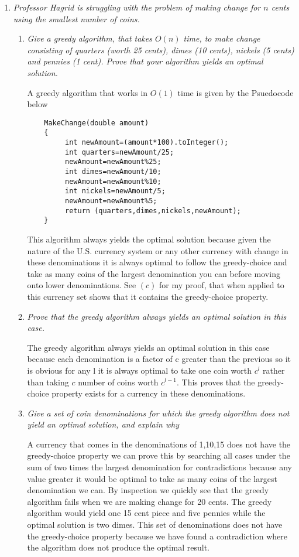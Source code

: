 \documentclass[12pt]{article}
\begin{document}
\begin{enumerate}
\begin{enumerate}
	\end{enumerate}
	
	
	\newpage
	
	\item \textit{Professor Hagrid is struggling with the problem of making change for $n$ cents using the smallest number of coins.}
	
	
	\begin{enumerate}

	\item \textit{Give a greedy algorithm, that takes $O(n)$ time, to make change consisting of quarters (worth 25 cents), dimes (10 cents), nickels (5 cents) and pennies (1 cent). Prove that your algorithm yields an optimal solution.}

	A greedy algorithm that works in $O(1)$ time is given by the Psuedocode below
	\begin{verbatim}
	MakeChange(double amount)
	{
		 int newAmount=(amount*100).toInteger();
		 int quarters=newAmount/25;
		 newAmount=newAmount%25;
		 int dimes=newAmount/10;
		 newAmount=newAmount%10;
		 int nickels=newAmount/5;
		 newAmount=newAmount%5;
		 return (quarters,dimes,nickels,newAmount);
	}
	\end{verbatim}
	This algorithm always yields the optimal solution because given the nature of the U.S. currency system or any other currency with change in these denominations it is always optimal to follow the greedy-choice and take as many coins of the largest denomination you can before moving onto lower denominations. See $(c)$ for my proof, that when applied to this currency set shows that it contains the greedy-choice property.

	\item \textit{Prove that the greedy algorithm always yields an optimal solution in this case.}

	The greedy algorithm always yields an optimal solution in this case because each denomination is a factor of c greater than the previous so it is obvious for any l it is always optimal to take one coin worth $c^l$ rather than taking $c$ number of coins worth $c^{l-1}$. This proves that the greedy-choice property exists for a currency in these denominations.
\newpage
	\item \textit{Give a set of coin denominations for which the greedy algorithm does not yield an optimal solution, and explain why}

	A currency that comes in the denominations of {1,10,15} does not have the greedy-choice property we can prove this by searching all cases under the sum of two times the largest denomination for contradictions because any value greater it would be optimal to take as many coins of the largest denomination we can. By inspection we quickly see that the greedy algorithm fails when we are making change for 20 cents. The greedy algorithm would yield one 15 cent piece and five pennies while the optimal solution is two dimes. This set of denominations does not have the greedy-choice property because we have found a contradiction where the algorithm does not produce the optimal result.
	\end{enumerate}
	

\end{enumerate}
\end{document}
